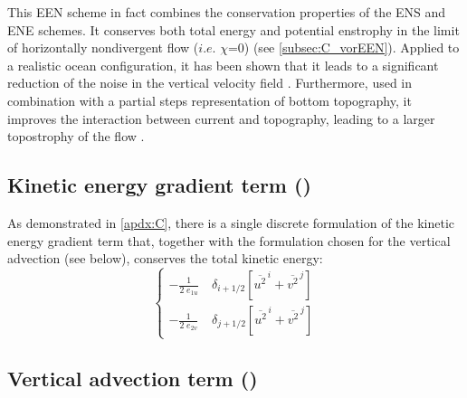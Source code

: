 \documentclass[../tex_main/NEMO_manual]{subfiles}
\begin{document}
This EEN scheme in fact combines the conservation properties of the ENS and ENE schemes. 
It conserves both total energy and potential enstrophy in the limit of horizontally 
nondivergent flow ($i.e.$ $\chi$=$0$) (see \autoref{subsec:C_vorEEN}). 
Applied to a realistic ocean configuration, it has been shown that it leads to a significant 
reduction of the noise in the vertical velocity field \citep{Le_Sommer_al_OM09}. 
Furthermore, used in combination with a partial steps representation of bottom topography,
it improves the interaction between current and topography, leading to a larger
topostrophy of the flow  \citep{Barnier_al_OD06, Penduff_al_OS07}. 

\subsection{Kinetic energy gradient term (\protect{})}
\label{subsec:DYN_keg}

As demonstrated in \autoref{apdx:C}, there is a single discrete formulation 
of the kinetic energy gradient term that, together with the formulation chosen for 
the vertical advection (see below), conserves the total kinetic energy:
\begin{equation} \label{eq:dynkeg}
\left\{ \begin{aligned}
 -\frac{1}{2 \; e_{1u} }  & \ \delta _{i+1/2} \left[ {\overline {u^2}^{\,i} + \overline{v^2}^{\,j}} \right]   \\
 -\frac{1}{2 \; e_{2v} }  & \ \delta _{j+1/2} \left[ {\overline {u^2}^{\,i} + \overline{v^2}^{\,j}} \right]    
\end{aligned} \right.
\end{equation} 

\subsection{Vertical advection term (\protect{}) }
\label{subsec:DYN_zad}
\end{document}
